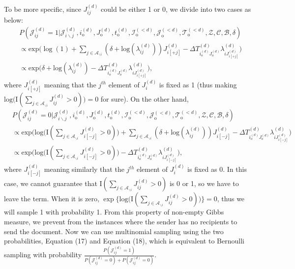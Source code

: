 \documentclass[a4paper]{article}
\begin{document}
   To be more specific, since ${J}^{(d)}_{ij}$ could be either 1 or 0, we divide into two cases as below:
   \begin{equation}
   \begin{aligned}
   &P(\mathcal{J}^{(d)}_{ij}=1| \mathcal{J}^{(d)}_{i\backslash j}, i^{(d)}_{\mbox{o}}, J^{(d)}_{\mbox{o}}, t^{(d)}_{\mbox{o}}, \mathcal{I}^{(<d)}_{\mbox{o}}, \mathcal{J}^{(<d)}_{\mbox{o}}, \mathcal{T}^{(<d)}_{\mbox{o}}, \mathcal{Z}, \mathcal{C}, \mathcal{B}, \delta)\\& \propto \mbox{exp}\Big(\log(1) +\sum_{j \in \mathcal{A}_{\backslash i}} ( \delta+\mbox{log}(\lambda_{ij}^{(d)}))J_{i[+j]}^{(d)} -\Delta T^{(d)}_{i_o^{(d)}J_o^{(d)}}\lambda^{(d)}_{iJ^{(d)}_{ i[+j]}}\Big)
   \\& \propto \mbox{exp}\Big(\delta+\mbox{log}(\lambda_{ij}^{(d)})-\Delta T^{(d)}_{i_o^{(d)}J_o^{(d)}}\lambda^{(d)}_{iJ^{(d)}_{ i[+j]}}\Big),
   \end{aligned}
   \end{equation}
   where $J^{(d)}_{i[+j]}$ meaning that the $j^{th}$ element of $J_{i}^{(d)}$ is fixed as 1 (thus making $\mbox{log}\big(\text{I}( \sum_{j \in \mathcal{A}_{\backslash i}} J^{(d)}_{ij} > 0 )\big) = 0$ for sure). On the other hand, 
   \begin{equation}
   \begin{aligned}
   &P(\mathcal{J}^{(d)}_{ij}=0| \mathcal{J}^{(d)}_{i\backslash j}, i^{(d)}_{\mbox{o}}, J^{(d)}_{\mbox{o}}, t^{(d)}_{\mbox{o}}, \mathcal{I}^{(<d)}_{\mbox{o}}, \mathcal{J}^{(<d)}_{\mbox{o}}, \mathcal{T}^{(<d)}_{\mbox{o}}, \mathcal{Z}, \mathcal{C}, \mathcal{B}, \delta)\\& \propto \mbox{exp}\Big(\mbox{log}\big(\text{I}( \sum_{j \in \mathcal{A}_{\backslash i}} J^{(d)}_{i[-j]} > 0 )\big) + \sum_{j \in \mathcal{A}_{\backslash i}} (\delta+\mbox{log}(\lambda_{ij}^{(d)}))J_{i[-j]}^{(d)} -\Delta T^{(d)}_{i_o^{(d)}J_o^{(d)}}\lambda^{(d)}_{iJ^{(d)}_{ i[-j]}}\Big)
   \\& \propto \mbox{exp}\Big(\mbox{log}\big(\text{I}( \sum_{j \in \mathcal{A}_{\backslash i}} J^{(d)}_{i[-j]} > 0 )\big) -\Delta T^{(d)}_{i_o^{(d)}J_o^{(d)}}\lambda^{(d)}_{iJ^{(d)}_{ i[-j]}}\Big),
   \end{aligned}
   \end{equation}
   where $J^{(d)}_{i[-j]}$ meaning similarly that the $j^{th}$ element of $J_{i}^{(d)}$ is fixed as 0. In this case, we cannot guarantee that $\text{I}( \sum_{j \in \mathcal{A}_{\backslash i}} J^{(d)}_{ij} > 0)$ is 0 or 1, so we have to leave the term. When it is zero, $\exp\{\mbox{log}\big(\text{I}( \sum_{j \in \mathcal{A}_{\backslash i}} J^{(d)}_{ij} > 0 )\big)\} = 0$, thus we will sample 1 with probability 1. From this property of non-empty Gibbs measure, we prevent from the instances where the sender has no recipients to send the document. Now we can use multinomial sampling using the two probabilities, Equation (17) and Equation (18), which is equivalent to Bernoulli sampling with probability $\frac{P(\mathcal{J}^{(d)}_{ij}=1)}{P(\mathcal{J}^{(d)}_{ij}=0)+ P(\mathcal{J}^{(d)}_{ij}=0)}$. 
\end{document}
